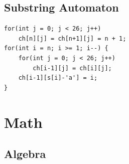 \documentclass[10pt]{ctexart}
\begin{document}
{\subsection{Substring Automaton}
\begin{lstlisting}
for(int j = 0; j < 26; j++) 
	ch[n][j] = ch[n+1][j] = n + 1;
for(int i = n; i >= 1; i--) {
	for(int j = 0; j < 26; j++) 
		ch[i-1][j] = ch[i][j];
	ch[i-1][s[i]-'a'] = i;
}
\end{lstlisting}







\newpage
\section{Math}
\subsection{Algebra}
}
\end{document}
